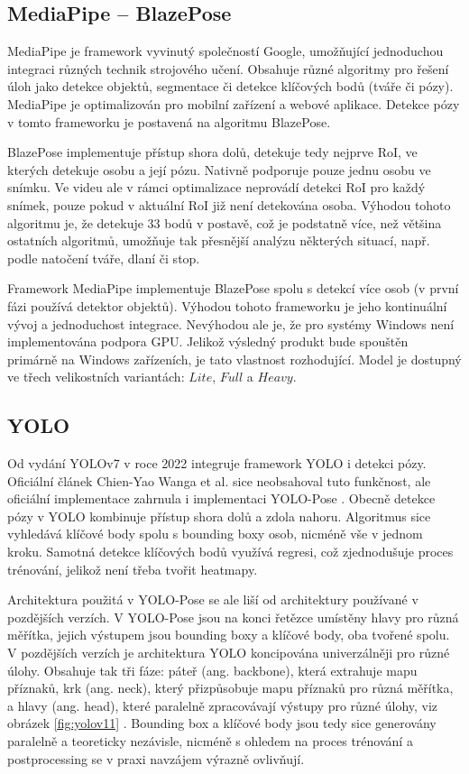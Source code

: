 \subsection{MediaPipe – BlazePose}

MediaPipe je framework vyvinutý společností Google, umožňující jednoduchou
integraci různých technik strojového učení. Obsahuje různé algoritmy pro řešení
úloh jako detekce objektů, segmentace či detekce klíčových bodů (tváře či
pózy). MediaPipe je optimalizován pro mobilní zařízení a webové aplikace.
Detekce pózy v tomto frameworku je postavená na algoritmu BlazePose.

BlazePose implementuje přístup shora dolů, detekuje tedy nejprve RoI, ve
kterých detekuje osobu a její pózu. Nativně podporuje pouze jednu osobu ve
snímku. Ve videu ale v rámci optimalizace neprovádí detekci RoI pro každý
snímek, pouze pokud v aktuální RoI již není detekována osoba. Výhodou tohoto
algoritmu je, že detekuje 33 bodů v postavě, což je podstatně více, než většina
ostatních algoritmů, umožňuje tak přesnější analýzu některých situací, např.
podle natočení tváře, dlaní či stop.

Framework MediaPipe implementuje BlazePose spolu s detekcí více osob (v
první fázi používá detektor objektů). Výhodou tohoto frameworku je jeho kontinuální
vývoj a jednoduchost integrace. Nevýhodou ale je, že pro systémy Windows není
implementována podpora GPU. Jelikož výsledný produkt bude spouštěn primárně na
Windows zařízeních, je tato vlastnost rozhodující. Model je dostupný ve třech
velikostních variantách: $Lite$, $Full$ a $Heavy$.

\subsection{YOLO}

Od vydání YOLOv7 v roce 2022 integruje framework YOLO i detekci pózy. Oficiální
článek Chien-Yao Wanga et al. \cite{yolov7} sice neobsahoval tuto funkčnost,
ale oficiální implementace zahrnula i implementaci YOLO-Pose \cite{yolo-pose}.
Obecně detekce pózy v YOLO kombinuje přístup shora dolů a zdola nahoru.
Algoritmus sice vyhledává klíčové body spolu s bounding boxy osob, nicméně vše
v jednom kroku. Samotná detekce klíčových bodů využívá regresi, což
zjednodušuje proces trénování, jelikož není třeba tvořit heatmapy.

Architektura použitá v YOLO-Pose se ale liší od architektury používané v
pozdějších verzích. V YOLO-Pose jsou na konci řetězce umístěny hlavy pro různá
měřítka, jejich výstupem jsou bounding boxy a klíčové body, oba tvořené spolu.
V pozdějších verzích je architektura YOLO koncipována univerzálněji pro různé
úlohy. Obsahuje tak tři fáze\cite{yolov11}: páteř (ang. backbone), která
extrahuje mapu příznaků, krk (ang. neck), který přizpůsobuje mapu příznaků pro
různá měřítka, a hlavy (ang. head), které paralelně zpracovávají výstupy pro
různé úlohy, viz obrázek \ref{fig:yolov11} . Bounding box a klíčové body jsou
tedy sice generovány paralelně a teoreticky nezávisle, nicméně s ohledem na
proces trénování a postprocessing se v praxi navzájem výrazně ovlivňují.

